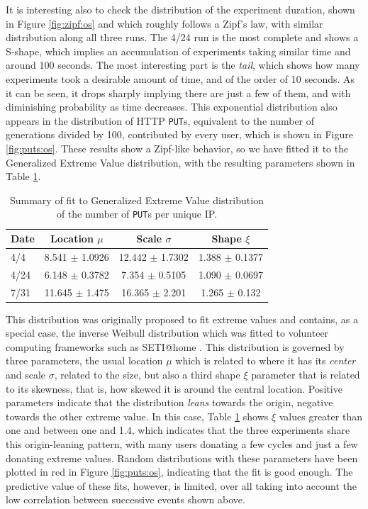\documentclass[journal,onecolumn]{IEEEtran}
\begin{document}
It is interesting also to check the distribution of the experiment
duration, shown in Figure \ref{fig:zipf:os} and which roughly follows
a Zipf's law, with similar distribution along all three runs. The 4/24
run is the most complete and shows a S-shape, which implies an
accumulation of experiments taking similar time and around 100
seconds. The most interesting part is the {\em tail}, which shows how
many experiments took a desirable amount of time, and of the order of
10 seconds. As it can be seen, it drops sharply implying there are
just a few of them, and with diminishing probability as time
decreases. This exponential distribution also appears in the
distribution of HTTP {\tt PUT}s, equivalent to the number of
generations divided by 100, contributed by every user, which is shown
in Figure \ref{fig:puts:os}. These results show a Zipf-like behavior,
so we have fitted it to the Generalized Extreme Value distribution,
with the resulting parameters shown in Table \ref{tab:puts:os}.
%
\begin{table}
\caption{Summary of fit to Generalized Extreme Value distribution of
  the number of {\tt PUT}s per unique IP. \label{tab:puts:os}}
\begin{center}
\begin{tabular}{l|ccc}
\hline
Date  & Location $\mu$ & Scale $\sigma$ & Shape $\xi$ \\
\hline
4/4 &  8.541 $\pm$ 1.0926  &    12.442 $\pm$ 1.7302 &  1.388 $\pm$
0.1377 \\
4/24 & 6.148 $\pm$ 0.3782 & 7.354 $\pm$ 0.5105 & 1.090 $\pm$  0.0697  \\
7/31 & 11.645 $\pm$ 1.475 & 16.365 $\pm$ 2.201 &  1.265 $\pm$ 0.132   \\
\hline
\end{tabular}
\end{center}
\end{table}
%
This distribution was originally proposed to fit extreme values
\cite{resnick2013extreme} and contains, as a special case, the inverse
Weibull distribution which was fitted to volunteer computing
frameworks such as SETI@home \cite{javadi2009mining}. This
distribution is governed by three parameters, the usual location $\mu$
which is related to where it has its {\em center} and  scale $\sigma$,
related to the size, but also a third shape $\xi$ parameter that is
related to its skewness, that is, how skewed it is around the central
location. Positive parameters indicate that the distribution {\em
  leans} towards the origin, negative towards the other extreme
value. In this case, Table \ref{tab:puts:os} shows $\xi$ values
greater than one and between one and 1.4, which indicates that the
three experiments share this origin-leaning pattern, with many users
donating a few cycles and just a few donating extreme values. Random
distributions with these parameters have been plotted in red in
Figure \ref{fig:puts:os}, indicating that the fit is good enough. The
predictive value of these fits, however, is limited, over all taking
into account the low correlation between successive events shown
above.
\end{document}
